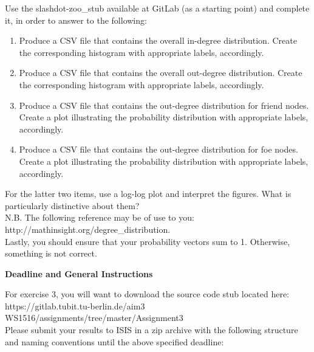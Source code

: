 \documentclass[11pt,a4paper]{article}
\newenvironment{cEnum}{
\begin{enumerate}
  \setlength{\itemsep}{0pt}
  \setlength{\parskip}{0pt}
  \setlength{\parsep}{0pt}
}{\end{enumerate}}
\begin{document}
Use the slashdot-zoo\_stub available at GitLab (as a starting point) and complete it, in order to answer to the following:
\begin{cEnum}
\item Produce a CSV file that contains the overall in-degree distribution. Create the corresponding histogram with appropriate labels, accordingly.
\item Produce a CSV file that contains the overall out-degree distribution. Create the corresponding histogram with appropriate labels, accordingly.
\item Produce a CSV file that contains the out-degree distribution for friend nodes. Create a plot illustrating the probability distribution with appropriate labels, accordingly.
\item Produce a CSV file that contains the out-degree distribution for foe nodes. Create a plot illustrating the probability distribution with appropriate labels, accordingly.
\end{cEnum}

For the latter two items, use a log-log plot and interpret the figures. What is particularly distinctive about them? \\

N.B. The following reference may be of use to you: http://mathinsight.org/degree\_distribution. \\ 
        Lastly, you should ensure that your probability vectors sum to 1. Otherwise, something is not correct.

\newpage
\centerline{\textbf{Deadline and General Instructions}}
\bigskip

For exercise 3, you will want to download the source code stub located here: \\
https://gitlab.tubit.tu-berlin.de/aim3 WS1516/assignments/tree/master/Assignment3\\

Please submit your results to ISIS in a zip archive with the following structure and naming conventions until the above specified deadline: \\

\end{document}
